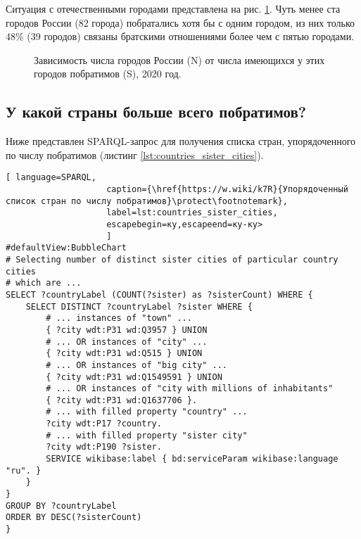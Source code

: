 Ситуация с отечественными городами представлена на рис. \ref{fig:city_relation_Russia_S_N}. Чуть менее ста городов России (82 города) побратались хотя бы с одним городом, из них только 48\% (39 городов) связаны братскими отношениями более чем с пятью городами.

\begin{figure}
{
\setlength{\fboxsep}{0pt}%
\setlength{\fboxrule}{1pt}%
}
  \caption{Зависимость числа городов России (N) от числа имеющихся у этих городов побратимов (S), 2020 год.}
  \label{fig:city_relation_Russia_S_N}
\end{figure}

\subsection{У какой страны больше всего побратимов?}

Ниже представлен SPARQL-запрос для получения списка стран, упорядоченного по числу побратимов (листинг \ref{lst:countries_sister_cities}).

\begin{lstlisting}[ language=SPARQL, 
                    caption={\href{https://w.wiki/k7R}{Упорядоченный список стран по числу побратимов}\protect\footnotemark},
                    label=lst:countries_sister_cities, 
                    escapebegin=ку,escapeend=ку-ку>
                    ]
#defaultView:BubbleChart
# Selecting number of distinct sister cities of particular country cities 
# which are ... 
SELECT ?countryLabel (COUNT(?sister) as ?sisterCount) WHERE { 
	SELECT DISTINCT ?countryLabel ?sister WHERE {
		# ... instances of "town" ...                          
		{ ?city wdt:P31 wd:Q3957 } UNION
		# ... OR instances of "city" ...
		{ ?city wdt:P31 wd:Q515 } UNION
		# ... OR instances of "big city" ...                                 
		{ ?city wdt:P31 wd:Q1549591 } UNION
		# ... OR instances of "city with millions of inhabitants"                            
		{ ?city wdt:P31 wd:Q1637706 }.
		# ... with filled property "country" ...                                 
		?city wdt:P17 ?country.
		# ... with filled property "sister city"                                        
		?city wdt:P190 ?sister.                                         
		SERVICE wikibase:label { bd:serviceParam wikibase:language "ru". }
	}                                 
}
GROUP BY ?countryLabel
ORDER BY DESC(?sisterCount)
}
\end{lstlisting}

